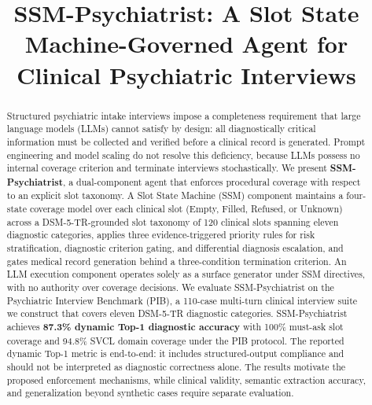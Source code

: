 \documentclass[conference]{IEEEtran}
\begin{document}
\title{SSM-Psychiatrist: A Slot State Machine-Governed Agent for Clinical Psychiatric Interviews}

\author{
}

\maketitle

\begin{abstract}
Structured psychiatric intake interviews impose a completeness
requirement that large language models (LLMs) cannot satisfy by design:
all diagnostically critical information must be collected and verified
before a clinical record is generated. Prompt engineering and model
scaling do not resolve this deficiency, because LLMs possess no
internal coverage criterion and terminate interviews stochastically. We
present \textbf{SSM-Psychiatrist}, a dual-component agent that enforces
procedural coverage with respect to an explicit slot taxonomy. A Slot State Machine (SSM)
component maintains a four-state coverage model over each clinical slot
(Empty, Filled, Refused, or Unknown) across a DSM-5-TR-grounded slot
taxonomy of 120 clinical slots spanning eleven diagnostic categories,
applies three evidence-triggered priority rules for risk
stratification, diagnostic criterion gating, and differential diagnosis
escalation, and gates medical record generation behind a three-condition
termination criterion. An LLM execution
component operates solely as a surface generator under SSM directives,
with no authority over coverage decisions. We evaluate SSM-Psychiatrist
on the Psychiatric Interview Benchmark (PIB), a 110-case multi-turn
clinical interview suite we construct that covers eleven DSM-5-TR
diagnostic categories. SSM-Psychiatrist achieves \textbf{87.3\% dynamic
Top-1 diagnostic accuracy} with 100\% must-ask slot coverage and 94.8\%
SVCL domain coverage under the PIB protocol. The reported dynamic Top-1
metric is end-to-end: it includes structured-output compliance and should
not be interpreted as diagnostic correctness alone. The results motivate
the proposed enforcement mechanisms, while clinical validity, semantic
extraction accuracy, and generalization beyond synthetic cases require
separate evaluation.
\end{abstract}
\end{document}
